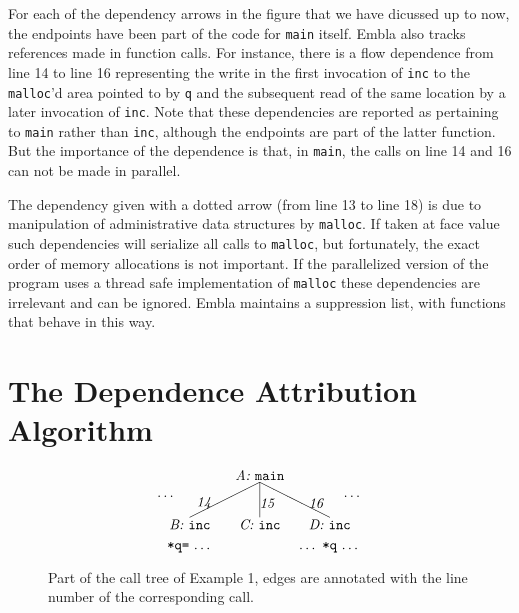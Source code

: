 \documentclass{acm_proc_article-sp}
\begin{document}
For each of the dependency arrows in the figure that 
we have dicussed up to now, the endpoints have been part of the 
code for {\tt main}
itself. Embla also tracks references made in function calls. For
instance, there is a flow dependence from line 14 to line 16
representing the write in the first invocation of {\tt inc} to the 
{\tt malloc}'d area pointed to by {\tt q} and the subsequent read 
of the same location by a later invocation of {\tt inc}. 
Note that these dependencies 
are reported as pertaining to {\tt main} rather than {\tt inc},
although the endpoints are part of the latter function. 
But the importance of the dependence is that, in {\tt main}, the calls
on line 14 and 16 can not be made in parallel.

The dependency given with a dotted arrow 
(from line 13 to line 18) is due to manipulation of administrative 
data structures by {\tt malloc}. If taken at face value such dependencies will
serialize all calls to {\tt malloc}, but fortunately, the exact order
of memory allocations is not important. If the 
parallelized version of the program uses a thread safe 
implementation of {\tt malloc} these dependencies are irrelevant and
can be ignored. Embla maintains a suppression list, with functions that behave 
in this way.





\section{The Dependence Attribution Algorithm}

\begin{figure} \small
\hrulefill
\[
\begin{picture}(160,60)(70,15)
\put(120,65){\makebox(60,10)[c]{\it A:\ \tt main}}
\put(150,65){\line(-2,-1){50}}
\put(150,65){\line( 0,-1){25}}
\put(150,65){\line( 2,-1){50}}
\put(95,45){\makebox(20,10)[r]{\it 14}}
\put(150,45){\makebox(20,10)[l]{\it 15}}
\put(185,45){\makebox(20,10)[l]{\it 16}}
\put(70,50){\makebox(20,10)[r]{\ldots}}
\put(210,50){\makebox(20,10)[l]{\ldots}}
\put(170,30){\makebox(60,10)[c]{\it D:\ \tt inc}}
\put(120,30){\makebox(60,10)[c]{\it C:\ \tt inc}}
\put(70,30){\makebox(60,10)[c]{\it B:\ \tt inc}}
\put(70,15){\makebox(60,10)[cb]{{\tt *q=}\ \ldots}}
\put(170,15){\makebox(60,10)[cb]{\ldots\ {\tt *q}\ \ldots}}
\end{picture}
\]
\hrulefill
\caption{Part of the call tree of Example 1, edges are annotated 
with the line number of the corresponding call.} 
\label{ffextree}
\end{figure}
\end{document}
